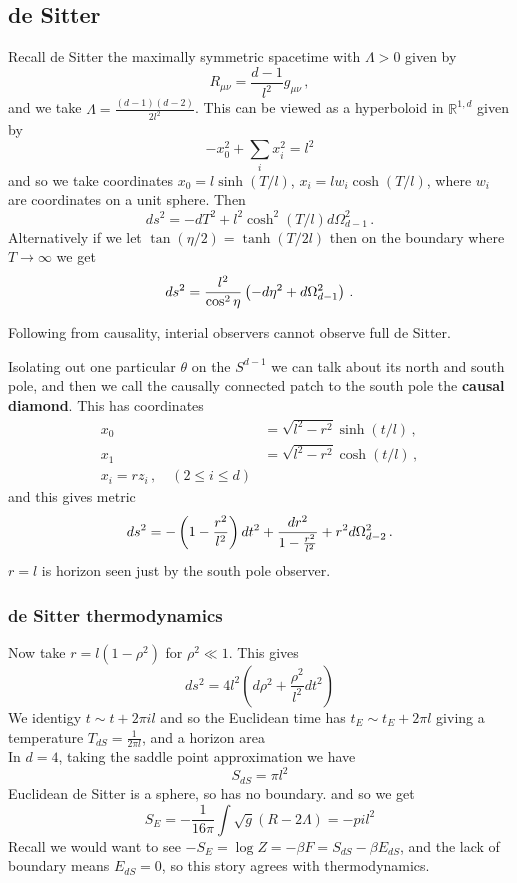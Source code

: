 \documentclass{article}
\begin{document}
\subsection{de Sitter}
Recall de Sitter the maximally symmetric spacetime with $\Lambda>0$ given by 
\[
R_{\mu \nu} = \frac{d-1}{l^2} g_{\mu \nu} \, ,
\]
and we take $\Lambda = \frac{(d-1)(d-2)}{2 l^2}$. This can be viewed as a hyperboloid in $\mathbb{R}^{1,d}$ given by 
\[
-x_0^2 + \sum_i x_i^2 = l^2
\]
and so we take coordinates $x_0 = l \sinh(T/l)$, $x_i = l w_i\cosh(T/l)$, where $w_i$ are coordinates on a unit sphere. Then 
\[
ds^2 = -dT^2 + l^2 \cosh^2(T/l) d \Omega_{d-1}^2 \, .
\]
Alternatively if we let $\tan(\eta/2) = \tanh(T/2l)$ then on the boundary where $T \to \infty$ we get 
\[
ds^2 = \frac{l^2}{\cos^2 \eta} \left( -d\eta^2 + d\Omega_{d-1}^2 \right) \, .
\] 
\begin{remark}
	Following from causality, interial observers cannot observe full de Sitter. 
\end{remark}
Isolating out one particular $\theta$ on the $S^{d-1}$ we can talk about its north and south pole, and then we call the causally connected patch to the south pole the \textbf{causal diamond}. This has coordinates 
\begin{align*}
	x_0 &= \sqrt{l^2 - r^2} \sinh(t/l) \, , \\
	x_1 &= \sqrt{l^2 - r^2} \cosh(t/l) \, , \\
	x_i = r z_i \, , \quad (2 \leq i \leq d)
\end{align*} 
and this gives metric 
\[
ds^2 = -\left( 1-\frac{r^2}{l^2} \right) dt^2 + \frac{dr^2}{1-\frac{r^2}{l^2}} + r^2 d \Omega_{d-2}^2 \, .
\]
$r=l$ is horizon seen just by the south pole observer. 
\subsubsection{de Sitter thermodynamics}
Now take $r = l(1-\rho^2)$ for $\rho^2 \ll 1$. This gives 
\[
ds^2 = 4l^2 (d \rho^2 + \frac{\rho^2}{l^2} dt^2)
\]
We identigy $t \sim t + 2\pi i l$ and so the Euclidean time has $t_E \sim t_E + 2 \pi l$ giving a temperature $T_{dS} = \frac{1}{2 \pi l}$, and a horizon area \\
In $d=4$, taking the saddle point approximation we have 
\[
S_{dS} = \pi  l^2 
\]
Euclidean de Sitter is a sphere, so has no boundary. and so we get 
\[
S_E = -\frac{1}{16 \pi} \int \sqrt{g}(R - 2\Lambda) = - pi l^2 
\]
Recall we would want to see $-S_E = \log Z = - \beta F = S_{dS} - \beta E_{dS}$, and the lack of boundary means $E_{dS} = 0$, so this story agrees with thermodynamics. 
\end{document}
